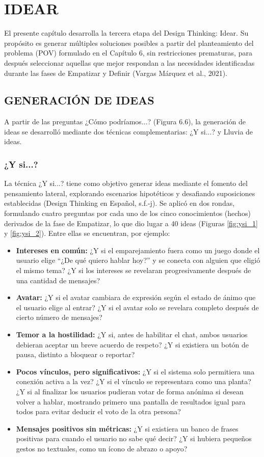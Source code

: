 \chapter{IDEAR}
El presente capítulo desarrolla la tercera etapa del Design Thinking: Idear. Su propósito es generar múltiples soluciones posibles a partir del planteamiento del problema (POV) formulado en el Capítulo 6, sin restricciones prematuras, para después seleccionar aquellas que mejor respondan a las necesidades identificadas durante las fases de Empatizar y Definir (Vargas Márquez et al., 2021).

\section{GENERACIÓN DE IDEAS}
A partir de las preguntas ¿Cómo podríamos...? (Figura 6.6), la generación de ideas se desarrolló mediante dos técnicas complementarias: ¿Y si...? y Lluvia de ideas.

\subsection{¿Y si...?}
La técnica ¿Y si...? tiene como objetivo generar ideas mediante el fomento del pensamiento lateral, explorando escenarios hipotéticos y desafiando suposiciones establecidas (Design Thinking en Español, s.f.-j). Se aplicó en dos rondas, formulando cuatro preguntas por cada uno de los cinco conocimientos (hechos) derivados de la fase de Empatizar, lo que dio lugar a 40 ideas (Figuras \ref{fig:ysi_1} y \ref{fig:ysi_2}). Entre ellas se encuentran, por ejemplo:

\begin{itemize}
    \item \textbf{Intereses en común:} ¿Y si el emparejamiento fuera como un juego donde el usuario elige ``¿De qué quiero hablar hoy?'' y se conecta con alguien que eligió el mismo tema? ¿Y si los intereses se revelaran progresivamente después de una cantidad de mensajes?
    \item \textbf{Avatar:} ¿Y si el avatar cambiara de expresión según el estado de ánimo que el usuario elige al entrar? ¿Y si el avatar solo se revelara completo después de cierto número de mensajes?
    \item \textbf{Temor a la hostilidad:} ¿Y si, antes de habilitar el chat, ambos usuarios debieran aceptar un breve acuerdo de respeto? ¿Y si existiera un botón de pausa, distinto a bloquear o reportar?
    \item \textbf{Pocos vínculos, pero significativos:} ¿Y si el sistema solo permitiera una conexión activa a la vez? ¿Y si el vínculo se representara como una planta? ¿Y si al finalizar los usuarios pudieran votar de forma anónima si desean volver a hablar, mostrando primero una pantalla de resultados igual para todos para evitar deducir el voto de la otra persona?
    \item \textbf{Mensajes positivos sin métricas:} ¿Y si existiera un banco de frases positivas para cuando el usuario no sabe qué decir? ¿Y si hubiera pequeños gestos no textuales, como un ícono de abrazo o apoyo?
\end{itemize}


